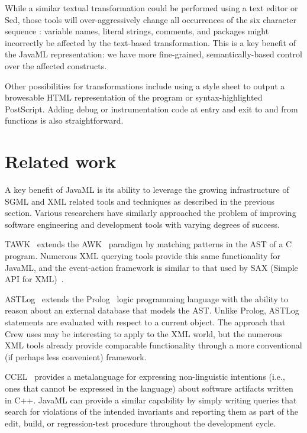 \documentclass{article}
\begin{document}
\begin{multicols}{2}
While a similar textual transformation could be performed using a text
editor or Sed, those tools will over-aggressively change all occurrences
of the six character sequence : variable names, literal
strings, comments, and packages might incorrectly be affected by the
text-based transformation. This is a key benefit of the JavaML
representation: we have more fine-grained, semantically-based control
over the affected constructs.

Other possibilities for transformations include using a style sheet to
output a browesable HTML representation of the program or
syntax-highlighted PostScript.  Adding debug or instrumentation code at
entry and exit to and from functions is also straightforward.

\section{Related work}
\label{sec-related}

A key benefit of JavaML is its ability to leverage the growing
infrastructure of SGML and XML related tools and techniques as described
in the previous section.  Various researchers have similarly approached
the problem of improving software engineering and development tools with
varying degrees of success.

TAWK~\cite{Griswold96} extends the AWK~\cite{Dougherty90} paradigm by matching
patterns in the AST of a C program.  Numerous XML querying tools provide
this same functionality for JavaML, and the event-action framework is
similar to that used by SAX (Simple API for XML)~\cite{SAX}.

ASTLog~\cite{Crew97} extends the Prolog~\cite{Clock94} logic programming
language with the ability to reason about an external database that
models the AST.  Unlike Prolog, ASTLog statements are evaluated with
respect to a current object.  The approach that Crew uses may be
interesting to apply to the XML world, but the numerous XML tools
already provide comparable functionality through a more conventional (if
perhaps less convenient) framework.

CCEL~\cite{CCEL92} provides a metalanguage for expressing non-linguistic
intentions (i.e., ones that cannot be expressed in the language) about
software artifacts written in C++.  JavaML can provide a similar
capability by simply writing queries that search for violations of the
intended invariants and reporting them as part of the edit, build, or
regression-test procedure throughout the development cycle.


\end{multicols}
\end{document}
